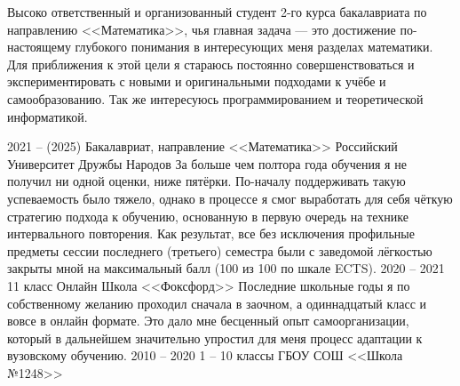 \documentclass[9pt]{developercv} %
\begin{document}

\begin{minipage}[t]{0.4\textwidth} %
    Высоко ответственный и организованный студент 2-го курса бакалавриата по направлению <<Математика>>, чья главная задача --- это достижение по-настоящему глубокого понимания в интересующих меня разделах математики. Для приближения к этой цели я стараюсь постоянно совершенствоваться и экспериментировать с новыми и оригинальными подходами к учёбе и самообразованию. Так же интересуюсь программированием и теоретической информатикой.
\end{minipage}
\hfill %
\begin{minipage}[t]{0.5\textwidth} %
	\vspace{-\baselineskip} %
	\begin{barchart}{5.5}
	\end{barchart}
\end{minipage}



\begin{entrylist}
	\entry
		{2021 -- (2025)}
		{Бакалавриат, направление <<Математика>>}
		{Российский Университет Дружбы Народов}
		{За больше чем полтора года обучения я не получил ни одной оценки, ниже пятёрки. По-началу поддерживать такую успеваемость было тяжело, однако в процессе я смог выработать для себя чёткую стратегию подхода к обучению, основанную в первую очередь на технике интервального повторения. Как результат, все без исключения профильные предметы сессии последнего (третьего) семестра были с заведомой лёгкостью закрыты мной на максимальный балл (100 из 100 по шкале ECTS).}
    \entry
        {2020 -- 2021}
        {11 класс}
        {Онлайн Школа <<Фоксфорд>>}
        {Последние школьные годы я по собственному желанию проходил сначала в заочном, а одиннадцатый класс и вовсе в онлайн формате. Это дало мне бесценный опыт самоорганизации, который в дальнейшем значительно упростил для меня процесс адаптации к вузовскому обучению.}
    \entry
        {2010 -- 2020}
        {1 -- 10 классы}
        {ГБОУ СОШ <<Школа №1248>>}
        {}
\end{entrylist}
\vspace{-1em}
\end{document}
